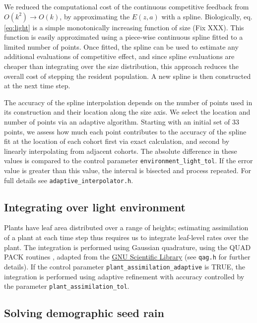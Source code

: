 \documentclass[10pt,twoside]{article}
\begin{document}
We reduced the computational cost of the continuous competitive feedback
from \(O(k^2) \rightarrow O(k)\), by approximating the \(E(z,a)\) with a
spline. Biologically, eq. \ref{eq:light} is a simple monotonically
increasing function of size (Fix XXX). This function is easily
approximated using a piece-wise continuous spline fitted to a limited
number of points. Once fitted, the spline can be used to estimate any
additional evaluations of competitive effect, and since spline
evaluations are cheaper than integrating over the size distribution,
this approach reduces the overall cost of stepping the resident
population. A new spline is then constructed at the next time step.

The accuracy of the spline interpolation depends on the number of points
used in its construction and their location along the size axis. We
select the location and number of points via an adaptive algorithm.
Starting with an initial set of 33 points, we assess how much each point
contributes to the accuracy of the spline fit at the location of each
cohort first via exact calculation, and second by linearly interpolating
from adjacent cohorts. The absolute difference in these values is
compared to the control parameter \texttt{environment\_light\_tol}. If
the error value is greater than this value, the interval is bisected and
process repeated. For full details see
\texttt{adaptive\_interpolator.h}.

\subsection{Integrating over light
environment}\label{integrating-over-light-environment}

Plants have leaf area distributed over a range of heights; estimating
assimilation of a plant at each time step thus requires us to integrate
leaf-level rates over the plant. The integration is performed using
Gaussian quadrature, using the QUAD PACK routines \citep{Piessens-1983},
adapted from the \href{http://www.gnu.org/software/gsl/}{GNU Scientific
Library}\citep{Galassi-2009} (see \texttt{qag.h} for further details).
If the control parameter \texttt{plant\_assimilation\_adaptive} is TRUE,
the integration is performed using adaptive refinement with accuracy
controlled by the parameter \texttt{plant\_assimilation\_tol}.

\subsection{Solving demographic seed
rain}\label{solving-demographic-seed-rain}
\end{document}
